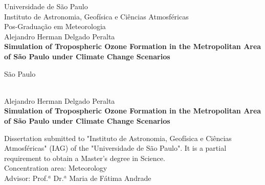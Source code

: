 


\frontmatter
\pagestyle{frontmatter}%
\begin{spacing}{1.5}
	
		\begin{titlepage}
		\begin{center}
			\vspace*{0.5cm}
			\Large{Universidade de S\~{a}o Paulo}\\
			\Large{Instituto de Astronomia, Geof\'{i}sica e Ci\^{e}ncias Atmosf\'{e}ricas}\\
			\Large{Pos-Gradua\c{c}\~{a}o em Meteorologia}\\[3cm]
			Alejandro Herman Delgado Peralta \\[3cm]

			\huge{\textbf{Simulation of Tropospheric Ozone Formation in the Metropolitan Area of S\~{a}o Paulo under Climate Change Scenarios}}\\[3mm]
			\vfill

			S\~{a}o Paulo \\
			\the\year \\
			
		\end{center}
	\end{titlepage}
	
	\newpage
	\thispagestyle{empty}
	\begin{titlepage}
		\begin{center}
			\vspace*{0.5cm}
			\Large{Alejandro Herman Delgado Peralta}\\[4cm]

			\huge{\textbf{Simulation of Tropospheric Ozone Formation in the Metropolitan Area of S\~{a}o Paulo under Climate Change Scenarios}}\\[4cm]
		\end{center}
		\hfill\begin{minipage}{0.5\linewidth}
		Dissertation submitted to "Instituto de Astronomia, Geof\'{i}sica e Ci\^{e}ncias Atmosf\'{e}ricas" (IAG) of the "Universidade de S\~{a}o Paulo". It is a partial requirement to obtain a Master's degree in Science.\\[1cm]
				Concentration area: Meteorology\\
				Advisor: Prof.$^a$ Dr.$^a$ Maria de F\'{a}tima Andrade
		\end{minipage}
	

\end{titlepage}
\end{spacing}
